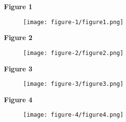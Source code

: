 \documentclass[12pt, twoside, letterpaper]{article}
\begin{document}
\textbf{Figure 1}
\begin{figure}[ht]
  \texttt{[image: figure-1/figure1.png]}
\end{figure}
\newpage

\textbf{Figure 2}
\begin{figure}[ht]
  \texttt{[image: figure-2/figure2.png]}
\end{figure}
\newpage

\textbf{Figure 3}
\begin{figure}[ht]
  \texttt{[image: figure-3/figure3.png]}
\end{figure}
\newpage

\textbf{Figure 4}
\begin{figure}[ht]
  \texttt{[image: figure-4/figure4.png]}
\end{figure}
\newpage
\end{document}
